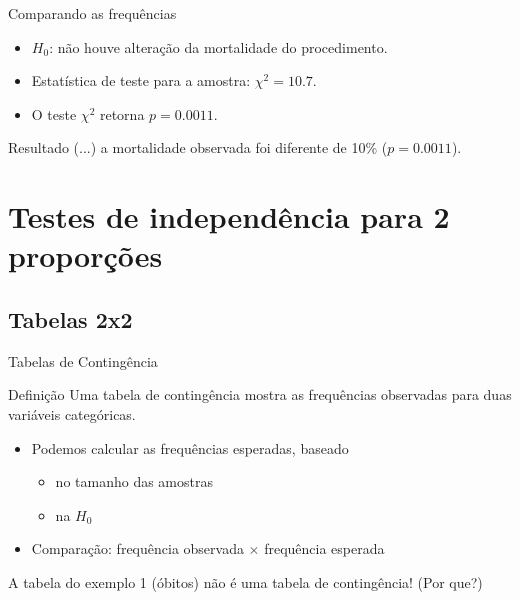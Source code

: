\documentclass{beamer}
\begin{document}
\begin{frame}{\scriptsize Comparando as frequências}
  \begin{itemize}
    \footnotesize
  \item $H_0$: não houve alteração da mortalidade do procedimento.
  \item Estatística de teste para a amostra: $\chi^2 = 10.7$.
  \item O teste $\chi^2$ retorna $p=0.0011$.
  \end{itemize}
  \bigskip
  \begin{exampleblock}{Resultado}
    \small
    (...) a mortalidade observada foi diferente de 10\% ($p=0.0011$).
  \end{exampleblock}
\end{frame}

\section[2 amostras]{Testes de independência para 2 proporções}

\subsection{Tabelas 2x2}

\begin{frame}{\scriptsize Tabelas de Contingência}
  \begin{block}{Definição}
    \footnotesize
    Uma \alert{tabela de contingência} mostra as frequências
    observadas para duas variáveis categóricas.
  \end{block}
  \bigskip
  \begin{itemize}
    \footnotesize
  \item Podemos calcular as frequências esperadas, baseado
    \begin{itemize}
      \scriptsize
    \item no tamanho das amostras
    \item na $H_0$
    \end{itemize}
  \item Comparação: frequência observada $\times$ frequência esperada
  \end{itemize}
  \bigskip
  \begin{block}{}
    \footnotesize
    A tabela do exemplo 1 (óbitos) \alert{não é} uma tabela de contingência! (Por que?)
  \end{block}
\end{frame}
\end{document}
